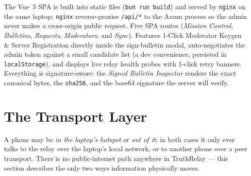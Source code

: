 \documentclass[11pt,a4paper]{article}
\newcommand{\projectname}{TruthRelay}
\begin{document}
The Vue~3 SPA is built into static files (\texttt{bun\ run\ build}) and served by \texttt{nginx} on the same laptop; \texttt{nginx} reverse-proxies \texttt{/api/*} to the Axum process so the admin never makes a cross-origin public request. Five SPA routes (\emph{Mission Control}, \emph{Bulletins}, \emph{Requests}, \emph{Moderators}, and \emph{Sync}). Features 1-Click Moderator Keygen \& Server Registration directly inside the sign-bulletin modal, auto-negotiates the admin token against a small candidate list (a dev convenience, persisted in \texttt{localStorage}), and displays live relay health probes with 1-click retry banners. Everything is signature-aware: the \emph{Signed Bulletin Inspector} renders the exact canonical bytes, the \texttt{sha256}, and the base64 signature the server will verify.

\section{The Transport Layer}
\label{sec:transport}

A phone may be \emph{in the laptop's hotspot} or \emph{out of it}; in
both cases it only ever talks to the relay over the laptop's local
network, or to another phone over a peer transport. There is no
public-internet path anywhere in \projectname{} --- this section
describes the only two ways information physically moves.
\end{document}
